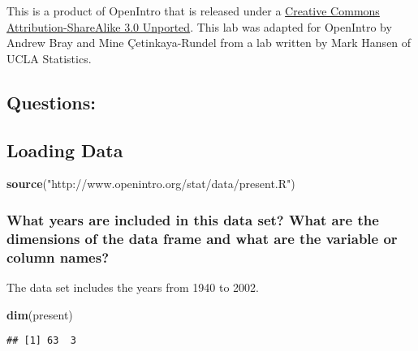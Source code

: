 \documentclass[
]{article}
\newenvironment{Shaded}{\begin{snugshade}}{\end{snugshade}}
\newcommand{\KeywordTok}[1]{\textcolor[rgb]{0.13,0.29,0.53}{\textbf{#1}}}
\newcommand{\NormalTok}[1]{#1}
\newcommand{\StringTok}[1]{\textcolor[rgb]{0.31,0.60,0.02}{#1}}
\begin{document}
\leavevmode\hypertarget{license}{}%
This is a product of OpenIntro that is released under a
\href{http://creativecommons.org/licenses/by-sa/3.0}{Creative Commons
Attribution-ShareAlike 3.0 Unported}. This lab was adapted for OpenIntro
by Andrew Bray and Mine Çetinkaya-Rundel from a lab written by Mark
Hansen of UCLA Statistics.

\hypertarget{questions}{%
\subsection{Questions:}\label{questions}}

\hypertarget{loading-data}{%
\subsection{Loading Data}\label{loading-data}}

\begin{Shaded}
\begin{Highlighting}[]
\KeywordTok{source}\NormalTok{(}\StringTok{"http://www.openintro.org/stat/data/present.R"}\NormalTok{)}
\end{Highlighting}
\end{Shaded}

\hypertarget{what-years-are-included-in-this-data-set-what-are-the-dimensions-of-the-data-frame-and-what-are-the-variable-or-column-names}{%
\subsubsection{\texorpdfstring{\textbf{What years are included in this
data set? What are the dimensions of the data frame and what are the
variable or column
names?}}{What years are included in this data set? What are the dimensions of the data frame and what are the variable or column names?}}\label{what-years-are-included-in-this-data-set-what-are-the-dimensions-of-the-data-frame-and-what-are-the-variable-or-column-names}}

The data set includes the years from 1940 to 2002.

\begin{Shaded}
\begin{Highlighting}[]
\KeywordTok{dim}\NormalTok{(present)}
\end{Highlighting}
\end{Shaded}

\begin{verbatim}
## [1] 63  3
\end{verbatim}
\end{document}
